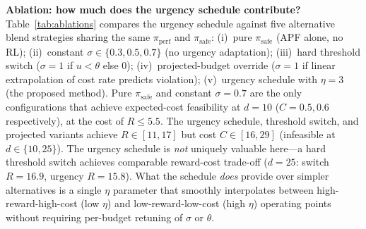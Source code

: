 \textbf{Ablation: how much does the urgency schedule contribute?}
Table~\ref{tab:ablations} compares the urgency schedule against five alternative blend strategies sharing the same $\pi_{\mathrm{perf}}$ and $\pi_{\mathrm{safe}}$:
(i)~pure $\pi_{\mathrm{safe}}$ (APF alone, no RL);
(ii)~constant $\sigma\in\{0.3, 0.5, 0.7\}$ (no urgency adaptation);
(iii)~hard threshold switch ($\sigma=1$ if $u<\theta$ else $0$);
(iv)~projected-budget override ($\sigma=1$ if linear extrapolation of cost rate predicts violation);
(v)~urgency schedule with $\eta=3$ (the proposed method).
Pure $\pi_{\mathrm{safe}}$ and constant $\sigma\!=\!0.7$ are the only configurations that achieve expected-cost feasibility at $d\!=\!10$ ($C\!=\!0.5, 0.6$ respectively), at the cost of $R\!\le\!5.5$.
The urgency schedule, threshold switch, and projected variants achieve $R\!\in\![11, 17]$ but cost $C\!\in\![16, 29]$ (infeasible at $d\!\in\!\{10, 25\}$).
The urgency schedule is \emph{not} uniquely valuable here---a hard threshold switch achieves comparable reward-cost trade-off ($d\!=\!25$: switch $R\!=\!16.9$, urgency $R\!=\!15.8$).
What the schedule \emph{does} provide over simpler alternatives is a single $\eta$ parameter that smoothly interpolates between high-reward-high-cost (low $\eta$) and low-reward-low-cost (high $\eta$) operating points without requiring per-budget retuning of $\sigma$ or $\theta$.

